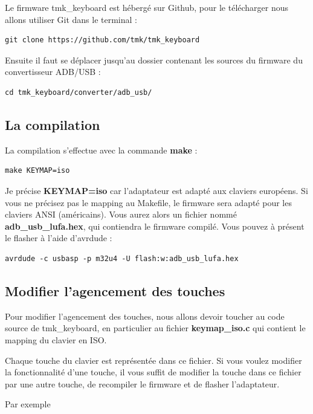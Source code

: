 \documentclass[12pt,a4paper,final]{article}
\begin{document}
Le firmware tmk\_keyboard est hébergé sur Github, pour le télécharger nous allons utiliser Git dans le terminal :

\begin{verbatim}
git clone https://github.com/tmk/tmk_keyboard
\end{verbatim}

Ensuite il faut se déplacer jusqu'au dossier contenant les sources du firmware du convertisseur ADB/USB :

\begin{verbatim}
cd tmk_keyboard/converter/adb_usb/
\end{verbatim}

\subsection{La compilation}

La compilation s'effectue avec la commande \textbf{make} :

\begin{verbatim}
make KEYMAP=iso
\end{verbatim}

Je précise \textbf{KEYMAP=iso} car l'adaptateur est adapté aux claviers européens. Si vous ne précisez pas le mapping au Makefile, le firmware sera adapté pour les claviers ANSI (américains).
Vous aurez alors un fichier nommé \textbf{adb\_usb\_lufa.hex}, qui contiendra le firmware compilé. Vous pouvez à présent le flasher à l'aide d'avrdude :

\begin{verbatim}
avrdude -c usbasp -p m32u4 -U flash:w:adb_usb_lufa.hex
\end{verbatim}

\subsection{Modifier l'agencement des touches}

Pour modifier l'agencement des touches, nous allons devoir toucher au code source de tmk\_keyboard, en particulier au fichier \textbf{keymap\_iso.c} qui contient le mapping du clavier en ISO.

Chaque touche du clavier est représentée dans ce fichier. Si vous voulez modifier la fonctionnalité d'une touche, il vous suffit de modifier la touche dans ce fichier par une autre touche, de recompiler le firmware et de flasher l'adaptateur.

Par exemple
\end{document}
